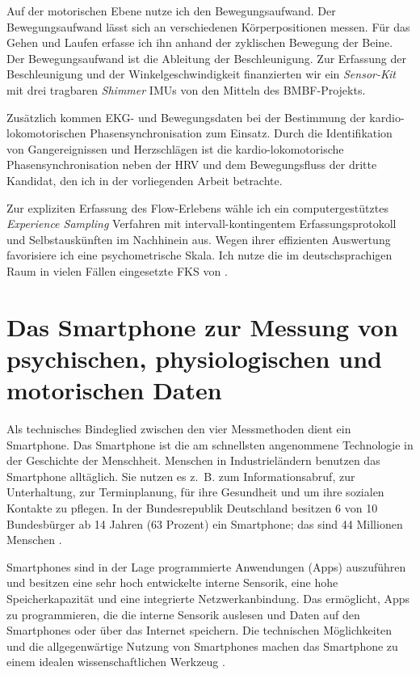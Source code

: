 Auf der motorischen Ebene nutze ich den Bewegungsaufwand. Der Bewegungsaufwand lässt sich an verschiedenen Körperpositionen messen. Für das Gehen und Laufen erfasse ich ihn anhand der zyklischen Bewegung der Beine. Der Bewegungsaufwand ist die Ableitung der Beschleunigung. Zur Erfassung der Beschleunigung und der Winkelgeschwindigkeit finanzierten wir ein \emph{Sensor-Kit} mit drei tragbaren \emph{Shimmer} \acp{IMU} von den Mitteln des \acs{BMBF}-Projekts.

Zusätzlich kommen \ac{EKG}- und Bewegungsdaten bei der Bestimmung der kardio-lokomotorischen Phasensynchronisation zum Einsatz. Durch die Identifikation von Gangereignissen und Herzschlägen ist die kardio-lokomotorische Phasensynchronisation neben der \ac{HRV} und dem Bewegungsfluss der dritte Kandidat, den ich in der vorliegenden Arbeit betrachte.

Zur expliziten Erfassung des Flow-Erlebens wähle ich ein computergestütztes \emph{Experience Sampling} Verfahren mit intervall-kontingentem Erfassungsprotokoll und Selbstauskünften im Nachhinein aus. Wegen ihrer effizienten Auswertung favorisiere ich eine psychometrische Skala. Ich nutze die im deutschsprachigen Raum in vielen Fällen eingesetzte \ac{FKS} von \citet{Rheinberg2003}.

\section{Das Smartphone zur Messung von psychischen, physiologischen und motorischen Daten}
\label{sec:das_smartphone_zur_messung}
Als technisches Bindeglied zwischen den vier Messmethoden dient ein Smartphone. Das Smartphone ist die am schnellsten angenommene Technologie in der Geschichte der Menschheit. Menschen in Industrieländern benutzen das Smartphone alltäglich. Sie nutzen es z.~B. zum Informationsabruf, zur Unterhaltung, zur Terminplanung, für ihre Gesundheit und um ihre sozialen Kontakte zu pflegen. In der Bundesrepublik Deutschland besitzen 6 von 10 Bundesbürger ab 14 Jahren (63 Prozent) ein Smartphone; das sind 44 Millionen Menschen \citep[vgl.][]{bitkom2015}.

Smartphones sind in der Lage programmierte Anwendungen (Apps) auszuführen und besitzen eine sehr hoch entwickelte interne Sensorik, eine hohe Speicherkapazität und eine integrierte Netzwerkanbindung. Das ermöglicht, Apps zu programmieren, die die interne Sensorik auslesen und Daten auf den Smartphones oder über das Internet speichern. Die technischen Möglichkeiten und die allgegenwärtige Nutzung von Smartphones machen das Smartphone zu einem idealen wissenschaftlichen Werkzeug \citep[vgl.][]{Raento2009}.

